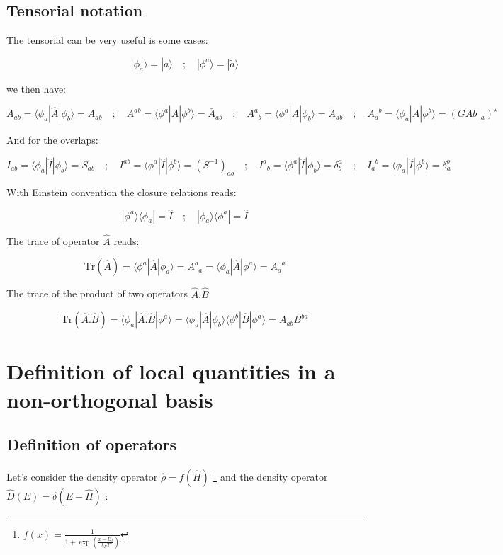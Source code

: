 \documentclass{article}
\newcommand{\bra}[1]{\langle #1|}
\newcommand{\ket}[1]{|#1\rangle}
\newcommand{\op}[1]{\hat{#1}}
\begin{document}
\subsection{Tensorial notation}

\noindent
The tensorial can be very useful is some cases:

\[ \ket{\phi_a}=\ket{a} \quad ; \quad \ket{\phi^a}=\ket{\tilde{a}} \]

\noindent
we then have:

\[ A_{ab}=\bra{\phi_a}\op{A}\ket{\phi_b}=A_{ab} \quad ; \quad  
A^{ab}=\bra{\phi^a}\op{A}\ket{\phi^b}=\bar{A}_{ab} \quad ; \quad  
A^{a}_{\; \;b}=\bra{\phi^a}\op{A}\ket{\phi_b}=\tilde{A}_{ab} \quad ; \quad 
A_{a}^{\; \;b}=\bra{\phi_a}\op{A}\ket{\phi^b}=( GA{b}_{\; \;a})^{\star}
 \]

\noindent
And for the overlaps:

\[ I_{ab}=\bra{\phi_a}\op{I}\ket{\phi_b}=S_{ab} \quad ; \quad  
I^{ab}=\bra{\phi^a}\op{I}\ket{\phi^b}=(S^{-1})_{ab} \quad ; \quad  
I^{a}_{\; \;b}=\bra{\phi^a}\op{I}\ket{\phi_b}=\delta^{a}_{b} \quad ; \quad 
I_{a}^{\; \;b}=\bra{\phi_a}\op{I}\ket{\phi^b}=\delta^{b}_{a}
 \]

\noindent
With Einstein convention the closure relations reads:

\[ \ket{\phi^a}\bra{\phi_a}=\op{I} \quad ; \quad  \ket{\phi_a}\bra{\phi^a}=\op{I}\]

\noindent
The trace of operator $\op{A}$ reads:

\[ \text{Tr}(\op{A})= \bra{\phi^a}\op{A}\ket{\phi_a}=A^{a}_{\; \;a}= \bra{\phi_a}\op{A}\ket{\phi^a}=A_{a}^{\; \;a}\]


\noindent
The trace of the product of two operators $\op{A}.\op{B}$

\[ \text{Tr}(\op{A}.\op{B})= \bra{\phi_a}\op{A}.\op{B}\ket{\phi^a}=
\bra{\phi_a}\op{A} \ket{\phi_b}\bra{\phi^b}\op{B}\ket{\phi^a}= A_{ab}B^{ba}\]

\section{Definition of local quantities in a non-orthogonal basis}


\subsection{Definition of operators}

\noindent 
Let's consider the density operator $\op{\rho}=f(\op{H})$ \footnote{$f(x)=\frac{1}{1+\exp(\frac{x-E_f}{k_BT})}$} and the density operator $\op{D}(E)=\delta(E-\op{H})$ :
\end{document}
